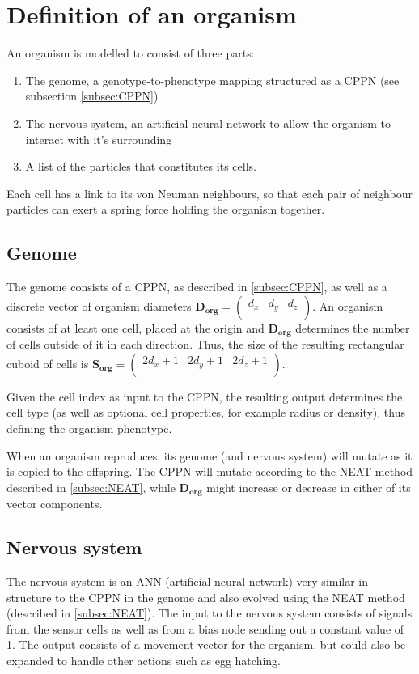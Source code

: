 \section{Definition of an organism}
An organism is modelled to consist of three parts:
\begin{enumerate}
    \item The genome, a genotype-to-phenotype mapping structured as a CPPN (see subsection \ref{subsec:CPPN})
    \item The nervous system, an artificial neural network to allow the organism to interact with it's surrounding
    \item A list of the particles that constitutes its cells.
\end{enumerate}
Each cell has a link to its von Neuman neighbours, so that each pair of neighbour particles can exert a spring force holding the organism together.

\subsection{Genome}
The genome consists of a CPPN, as described in \ref{subsec:CPPN}, as well as a discrete vector of organism diameters \(\mathbf{D_{org}}=\left(\begin{array}{ccc} d_x & d_y & d_z \\\end{array}\right)\). An organism consists of at least one cell, placed at the origin and \(\mathbf{D_{org}}\) determines the number of cells outside of it in each direction. Thus, the size of the resulting rectangular cuboid of cells is
\(\mathbf{S_{org}}=\left(\begin{array}{ccc} 2 d_x + 1 & 2 d_y + 1 & 2 d_z + 1 \\\end{array}\right)\).

Given the cell index as input to the CPPN, the resulting output determines the cell type (as well as optional cell properties, for example radius or density), thus defining the organism phenotype.

When an organism reproduces, its genome (and nervous system) will mutate as it is copied to the offspring. The CPPN will mutate according to the NEAT method described in \ref{subsec:NEAT}, while \(\mathbf{D_{org}}\) might increase or decrease in either of its vector components.

\subsection{Nervous system} \label{subsec:nervousSystem}
The nervous system is an ANN (artificial neural network) very similar in structure to the CPPN in the genome and also evolved using the NEAT method (described in \ref{subsec:NEAT}). The input to the nervous system consists of signals from the sensor cells as well as from a bias node sending out a constant value of 1. The output consists of a movement vector for the organism, but could also be expanded to handle other actions such as egg hatching.

